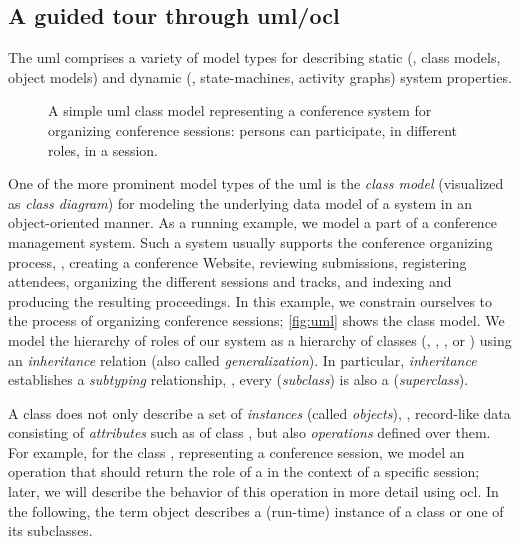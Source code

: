 \subsection{A guided tour through
  \texorpdfstring{\acs{uml}/\acs{ocl}}{UML/OCL}}
\label{sec:guidedtour}
The \acf{uml} comprises a variety of model types for describing static
(\eg, class models, object models) and dynamic (\eg, state-machines,
activity graphs) system properties.
\begin{figure}
  \centering{}%
  \caption{A simple \acs{uml} class model representing a conference
    system for organizing conference sessions: persons can
    participate, in different roles, in a session. \label{fig:uml}}
\end{figure}
One of the more prominent model types of the \acs{uml} is the
\emph{class model} (visualized as \emph{class diagram}) for modeling
the underlying data model of a system in an object-oriented manner. As
a running example, we model a part of a conference management
system. Such a system usually supports the conference organizing
process, \eg, creating a conference Website, reviewing submissions,
registering attendees, organizing the different sessions and tracks,
and indexing and producing the resulting proceedings. In this example,
we constrain ourselves to the process of organizing conference
sessions; \autoref{fig:uml} shows the class model.  We model the
hierarchy of roles of our system as a hierarchy of classes (\eg,
, , or ) using
an \emph{inheritance} relation (also called \emph{generalization}). In
particular, \emph{inheritance} establishes a \emph{subtyping}
relationship, \ie, every  (\emph{subclass}) is also
a  (\emph{superclass}).

A class does not only describe a set of \emph{instances} (called
\emph{objects}), \ie, record-like data consisting of \emph{attributes}
such as  of class , but also
\emph{operations} defined over them. For example, for the class
, representing a conference session, we model an
operation  that should return the
role of a  in the context of a specific session;
later, we will describe the behavior of this operation in more detail
using \acs{ocl}. In the following, the term object describes a
(run-time) instance of a class or one of its subclasses.

